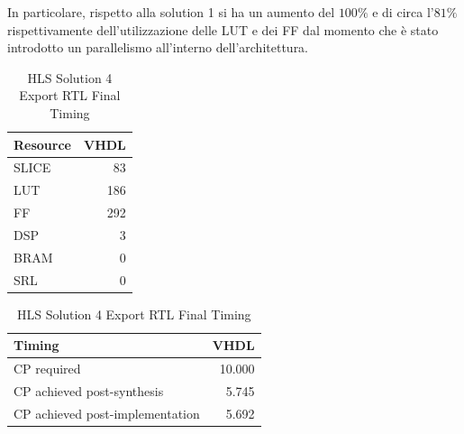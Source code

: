 In particolare, rispetto alla solution 1 si ha un aumento del $100\%$ e di circa l'$81\%$ rispettivamente dell'utilizzazione delle LUT e dei FF dal momento che è stato introdotto un parallelismo all'interno dell'architettura.

\begin{table}[H]
	\centering
	\begin{minipage}[t]{0.45\linewidth}
		\centering
		\begin{tabular}{|l|r|}
			\hline
			\textbf{Resource} & \textbf{VHDL} \\
			\hline
			SLICE & 83 \\
			\hline
			LUT & 186 \\
			\hline
			FF & 292 \\
			\hline
			DSP & 3 \\
			\hline
			BRAM & 0 \\
			\hline
			SRL & 0 \\
			\hline
		\end{tabular}
		\caption{HLS Solution 4 Export RTL Resource Usage}
		\label{tab:hls-solution-4-export-rtl-resoruce-usage}
	\end{minipage}
	\hfill
	\begin{minipage}[t]{0.45\linewidth}
		\centering
		\begin{tabular}{|l|r|}
			\hline
			\textbf{Timing} & \textbf{VHDL} \\
			\hline
			CP required & 10.000 \\
			\hline
			CP achieved post-synthesis & 5.745 \\
			\hline
			CP achieved post-implementation & 5.692 \\
			\hline
		\end{tabular}
		\caption{HLS Solution 4 Export RTL Final Timing}
		\label{tab:hls-solution-4-export-rtl-final-timing}
	\end{minipage}
\end{table}